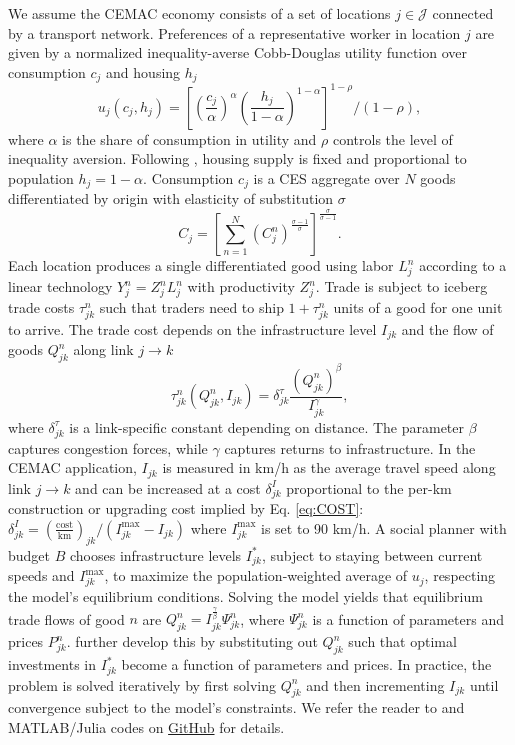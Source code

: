 \documentclass[a4paper]{article}
\begin{document}
We assume the CEMAC economy consists of a set of locations $j \in \mathcal{J}$ connected by a transport network. Preferences of a representative worker in location $j$ are given by a normalized inequality-averse Cobb-Douglas utility function over consumption $c_j$ and housing $h_j$
\begin{equation}
u_j(c_j, h_j) = \left[\left(\frac{c_j}{\alpha}\right)^\alpha \left(\frac{h_j}{1-\alpha}\right)^{1-\alpha}\right]^{1-\rho}/(1-\rho),
\end{equation}
where $\alpha$ is the share of consumption in utility and $\rho$ controls the level of inequality aversion. Following \citet{graff2024spatial}, housing supply is fixed and proportional to population $h_j = 1-\alpha$. Consumption $c_j$ is a CES aggregate over $N$ goods differentiated by origin with elasticity of substitution $\sigma$
\begin{equation}
C_j = \left[\sum_{n=1}^N (C_j^n)^\frac{\sigma-1}{\sigma}\right]^\frac{\sigma}{\sigma-1}.
\end{equation}
Each location produces a single differentiated good using labor $L_j^n$ according to a linear technology $Y_j^n = Z_j^nL_j^n$ with productivity $Z_j^n$. Trade is subject to iceberg trade costs $\tau_{jk}^n$ such that traders need to ship $1+\tau_{jk}^n$ units of a good for one unit to arrive. The trade cost depends on the infrastructure level $I_{jk}$ and the flow of goods $Q^n_{jk}$ along link $j\to k$
\begin{equation} \label{eq:tau}
\tau_{jk}^n (Q^n_{jk}, I_{jk}) = \delta^\tau_{jk}\frac{(Q^n_{jk})^\beta}{I_{jk}^\gamma},
\end{equation}
where $\delta^\tau_{jk}$ is a link-specific constant depending on distance. The parameter $\beta$ captures congestion forces, while $\gamma$ captures returns to infrastructure. In the CEMAC application, $I_{jk}$ is measured in km/h as the average travel speed along link $j\to k$ and can be increased at a cost $\delta^I_{jk}$ proportional to the per-km construction or upgrading cost implied by Eq. \ref{eq:COST}: $\delta^I_{jk} = (\frac{\text{cost}}{\text{km}})_{jk} / (I^\text{max}_{jk} - I_{jk})$ where $I^\text{max}_{jk}$ is set to 90 km/h. A social planner with budget $B$ chooses infrastructure levels $I_{jk}^*$, subject to staying between current speeds and $I^\text{max}_{jk}$, to maximize the population-weighted average of $u_j$, respecting the model's equilibrium conditions. Solving the model yields that equilibrium trade flows of good $n$ are $Q^n_{jk} = I_{jk}^{\frac{\gamma}{\beta}}\Psi^n_{jk}$, where $\Psi^n_{jk}$ is a function of parameters and prices $P^n_{jk}$. \citet{fajgelbaum2020optimal} further develop this by substituting out $Q^n_{jk}$ such that optimal investments in $I_{jk}^*$ become a function of parameters and prices. In practice, the problem is solved iteratively by first solving $Q^n_{jk}$ and then incrementing $I_{jk}$ until convergence subject to the model's constraints. We refer the reader to \citet{fajgelbaum2020optimal} and MATLAB/Julia codes on \href{https://github.com/OptimalTransportNetworks}{GitHub} for details.
\end{document}
